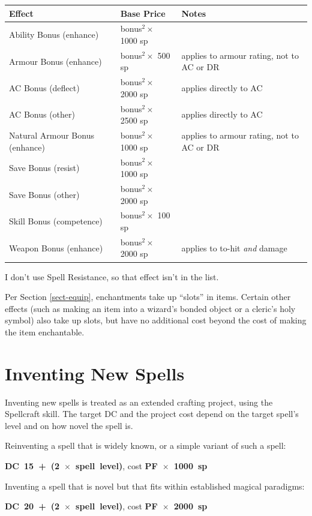 \begin{tabular}{lll} \hline
\textbf{Effect} & \textbf{Base Price} & \textbf{Notes} \\ \hline
Ability Bonus (enhance) & bonus$^2 \times$ 1000 sp & \\
Armour Bonus (enhance) & bonus$^2 \times$ 500 sp &
applies to armour rating, not to AC or DR \\
AC Bonus (deflect) & bonus$^2 \times$ 2000 sp & applies directly to AC \\
AC Bonus (other) & bonus$^2 \times$ 2500 sp & applies directly to AC \\
Natural Armour Bonus (enhance) & bonus$^2 \times$ 1000 sp &
applies to armour rating, not to AC or DR \\
Save Bonus (resist) & bonus$^2 \times$ 1000 sp & \\
Save Bonus (other) & bonus$^2 \times$ 2000 sp & \\
Skill Bonus (competence) & bonus$^2 \times$ 100 sp & \\
Weapon Bonus (enhance) & bonus$^2 \times$ 2000 sp &
applies to to-hit \textit{and} damage \\
\hline
\end{tabular}

I don't use Spell Resistance, so that effect isn't in the list.

Per Section \ref{sect-equip}, enchantments take up ``slots'' in items.
Certain other effects (such as making an item into a wizard's bonded object
or a cleric's holy symbol) also take up slots, but have no additional cost
beyond the cost of making the item enchantable.
%

%
\section{Inventing New Spells}

Inventing new spells is treated as an extended crafting project, using the
Spellcraft skill. The target DC and the project cost depend on the target
spell's level and on how novel the spell is.


Reinventing a spell that is widely known, or a simple variant of such
a spell:

\mbox{\bfseries DC 15 + (2 $\times$ spell level)}, cost
\mbox{\bfseries PF $\times$ 1000 sp}

Inventing a spell that is novel but that fits within established magical
paradigms:

\mbox{\bfseries DC 20 + (2 $\times$ spell level)}, cost
\mbox{\bfseries PF $\times$ 2000 sp}

